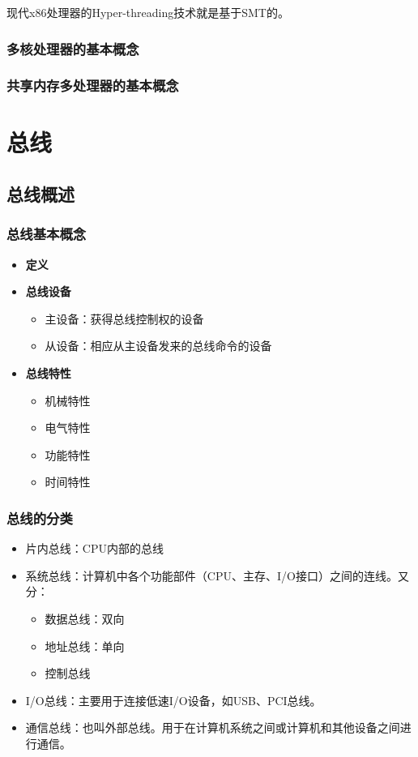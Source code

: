 \documentclass[12pt, a4paper, oneside]{ctexart}
\begin{document}
现代x86处理器的Hyper-threading技术就是基于SMT的。

\subsubsection{多核处理器的基本概念}

\subsubsection{共享内存多处理器的基本概念}

\section{总线}

\subsection{总线概述}

\subsubsection{总线基本概念}

\begin{itemize}
  \item {\bf 定义}
  \item {\bf 总线设备}
  \begin{itemize}
    \item 主设备：获得总线控制权的设备
    \item 从设备：相应从主设备发来的总线命令的设备
  \end{itemize}
  \item {\bf 总线特性}
  \begin{itemize}
    \item 机械特性
    \item 电气特性
    \item 功能特性
    \item 时间特性
  \end{itemize}
\end{itemize}

\subsubsection{总线的分类}

\begin{itemize}
  \item 片内总线：CPU内部的总线
  \item 系统总线：计算机中各个功能部件（CPU、主存、I/O接口）之间的连线。又分：
  \begin{itemize}
    \item 数据总线：双向
    \item 地址总线：单向
    \item 控制总线
  \end{itemize}
  \item I/O总线：主要用于连接低速I/O设备，如USB、PCI总线。
  \item 通信总线：也叫外部总线。用于在计算机系统之间或计算机和其他设备之间进行通信。
\end{itemize}
\end{document}
